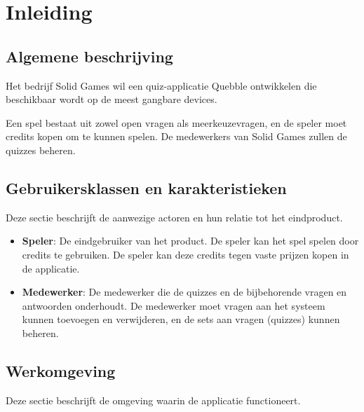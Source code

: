 

\clearpage\section{Inleiding}

\subsection{Algemene beschrijving}
Het bedrijf Solid Games wil een quiz-applicatie Quebble ontwikkelen die beschikbaar wordt op de meest gangbare devices.

Een spel bestaat uit zowel open vragen als meerkeuzevragen, en de speler moet credits kopen om te kunnen spelen. De medewerkers van Solid Games zullen de quizzes beheren.

\subsection{Gebruikersklassen en karakteristieken}
Deze sectie beschrijft de aanwezige actoren en hun relatie tot het eindproduct.
\begin{itemize}
   \item \textbf{Speler}: De eindgebruiker van het product. De speler kan het spel spelen door credits te gebruiken. De speler kan deze credits tegen vaste prijzen kopen in de applicatie.
   \item \textbf{Medewerker}: De medewerker die de quizzes en de bijbehorende vragen en antwoorden onderhoudt. De medewerker moet vragen aan het systeem kunnen toevoegen en verwijderen, en de sets aan vragen (quizzes) kunnen beheren.
\end{itemize}

\subsection{Werkomgeving}
Deze sectie beschrijft de omgeving waarin de applicatie functioneert.

